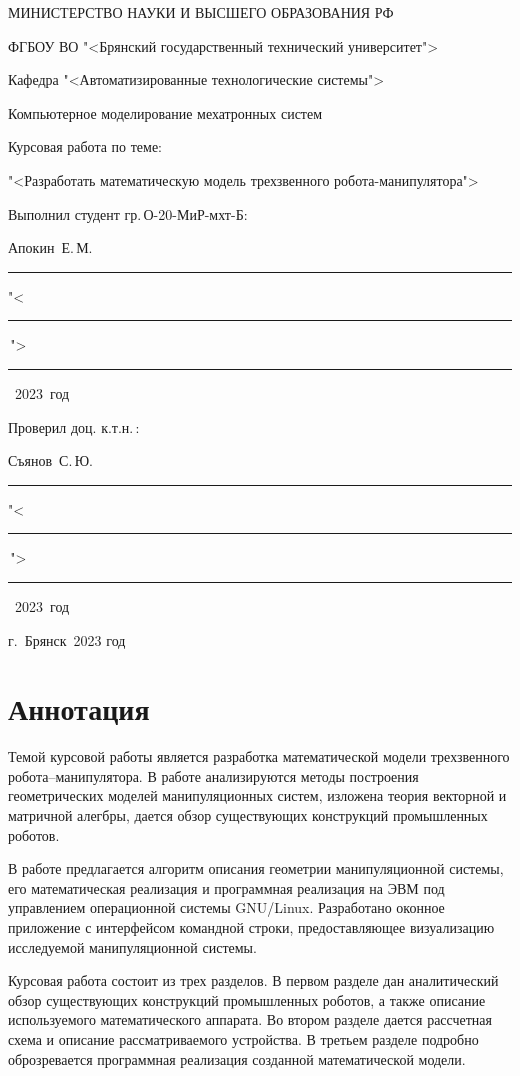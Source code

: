 \documentclass[oneside, final, 14pt]{extarticle}
\begin{document}
\begin{titlepage}
  \centerline{МИНИСТЕРСТВО НАУКИ И ВЫСШЕГО ОБРАЗОВАНИЯ РФ}
  \medskip
  \centerline{ФГБОУ ВО "<Брянский государственный технический университет">}
  \vfill
  \centerline{Кафедра "<Автоматизированные технологические системы">}
  \vfill
  \vfill
  \centerline{Компьютерное моделирование мехатронных систем}
  \vfill
  \centerline{Курсовая работа по теме:}
  \medskip
  \centerline{"<Разработать математическую модель трехзвенного робота-манипулятора">}
  \vfill
  \null \hfill
  \begin{minipage}{0.52\textwidth}
    Выполнил студент гр.\,О-20-МиР-мхт-Б:
	\par
	\medskip
	Апокин~Е.\,М.\,
	\rule{5.5cm}{0.25pt}
	\par
	\medskip
	"<\rule{1.25cm}{0.25pt}\,">\rule{5cm}{0.25pt}~2023~год
	\par
	\bigskip
	Проверил доц. к.т.н.\,:
	\par
	\medskip
	Съянов~С.\,Ю.\,
	\rule{5.5cm}{0.25pt}
	\par
	\medskip
	"<\rule{1.25cm}{0.25pt}\,">\rule{5cm}{0.25pt}~2023~год
  \end{minipage}
  \vfill
  \centerline{г.~Брянск~2023 год}
\end{titlepage}
\setcounter{page}{2}

\section*{Аннотация}

Темой курсовой работы является разработка математической модели трехзвенного робота--манипулятора.
В работе анализируются методы построения геометрических моделей манипуляционных систем, изложена теория векторной и матричной алегбры, дается обзор существующих конструкций промышленных роботов.
\par
В работе предлагается алгоритм описания геометрии манипуляционной системы, его математическая реализация и программная реализация на ЭВМ под управлением операционной системы GNU/Linux.
Разработано оконное приложение с интерфейсом командной строки, предоставляющее визуализацию исследуемой манипуляционной системы.
\par
Курсовая работа состоит из трех разделов.
В первом разделе дан аналитический обзор существующих конструкций промышленных роботов, а также описание используемого математического аппарата.
Во втором разделе дается рассчетная схема и описание рассматриваемого устройства.
В третьем разделе подробно оброзревается программная реализация созданной математической модели.
\end{document}
